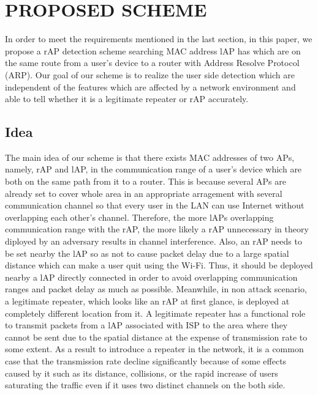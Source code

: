 \documentclass[conference]{IEEEtran}
\begin{document}
\section{PROPOSED SCHEME}
In order to meet the requirements mentioned in the last section, in this paper, we propose a rAP detection scheme searching MAC address lAP has which are on the same route from a user's device to a router with Address Resolve Protocol (ARP).  
Our goal of our scheme is to realize the user side detection which are independent of the features which are affected by a network environment and able to tell whether it is a legitimate repeater or rAP accurately.

\subsection{Idea}
The main idea of our scheme is that there exists MAC addresses of two APs, namely, rAP and lAP, in the communication range of a user's device which are both on the same path from it to a router.
This is because several APs are already set to cover whole area in an appropriate arragement with several communication channel so that every user in the LAN can use Internet without overlapping each other's channel.
Therefore, the more lAPs overlapping communication range with the rAP, the more likely a rAP unnecessary in theory diployed by an adversary results in channel interference.
Also, an rAP needs to be set nearby the lAP so as not to cause packet delay due to a large spatial distance which can make a user quit using the Wi-Fi.
Thus, it should be deployed nearby a lAP directly connected in order to avoid overlapping communication ranges and packet delay as much as possible.
Meanwhile, in non attack scenario, a legitimate repeater, which looks like an rAP at first glance, is deployed at completely different location from it.
A legitimate repeater has a functional role to transmit packets from a lAP associated with ISP to the area where they cannot be sent due to the spatial distance at the expense of transmission rate to some extent.
As a result to introduce a repeater in the network, it is a common case that the transmission rate decline significantly because of some effects caused by it such as its distance, collisions, or the rapid increase of users saturating the traffic even if it uses two distinct channels on the both side. 
\end{document}
